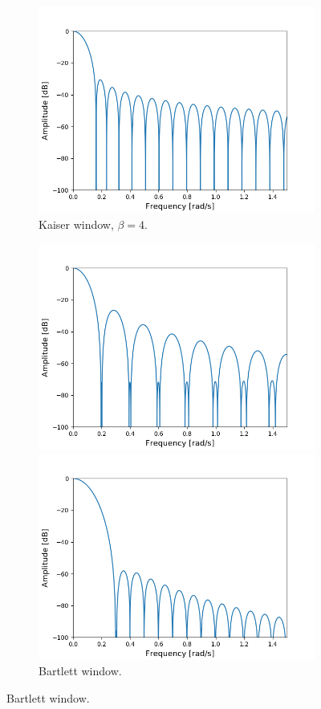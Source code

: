 \begin{figure}[H]
\begin{subfigure}{0.49\textwidth}
\caption{Hamming window.}
\includegraphics[width=\textwidth]{figures/dbplots/stft_bilag/64/kaiser4.png}
\caption{Kaiser window, $\beta=4$.}
\end{subfigure}
\centering
\begin{subfigure}{0.49\textwidth}
\centering
\includegraphics[width=\textwidth]{figures/dbplots/stft_bilag/64/bartlett.png}
\caption{Bartlett window.}
\includegraphics[width=\textwidth]{figures/dbplots/stft_bilag/64/blackman.png}

\end{subfigure}
\end{figure}
